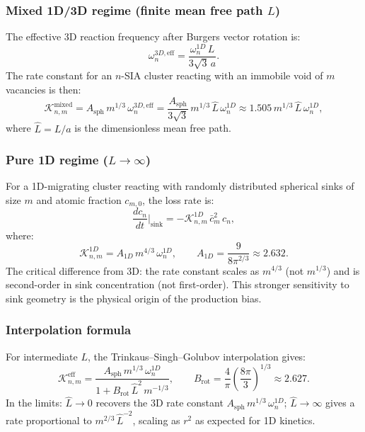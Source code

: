 \subsubsection{Mixed 1D/3D regime (finite mean free path $L$)}

The effective 3D reaction frequency after Burgers vector rotation is:
\begin{equation}\label{eq:omega_3D_eff}
    \omega_n^{3D,\mathrm{eff}}
    = \frac{\omega_n^{1D}\,L}{3\sqrt{3}\,a}.
\end{equation}
The rate constant for an $n$-SIA cluster reacting with an immobile void of $m$
vacancies is then:
\begin{equation}\label{eq:K_mixed}
    \mathcal{K}_{n,m}^{\mathrm{mixed}}
    = A_{\mathrm{sph}}\,m^{1/3}\,\omega_n^{3D,\mathrm{eff}}
    = \frac{A_{\mathrm{sph}}}{3\sqrt{3}}\,m^{1/3}\,\hat{L}\,\omega_n^{1D}
    \approx 1.505\,m^{1/3}\,\hat{L}\,\omega_n^{1D},
\end{equation}
where $\hat{L} = L/a$ is the dimensionless mean free path.

\subsubsection{Pure 1D regime ($L \to \infty$)}

For a 1D-migrating cluster reacting with randomly distributed spherical sinks
of size $m$ and atomic fraction $c_{m,0}$, the loss rate is:
\begin{equation}\label{eq:1D_loss}
    \frac{dc_n}{dt}\bigg|_{\text{sink}}
    = -\mathcal{K}_{n,m}^{1D}\,\bar{c}_m^2\,c_n,
\end{equation}
where:
\begin{equation}\label{eq:K1D}
    \mathcal{K}_{n,m}^{1D}
    = A_{1D}\,m^{4/3}\,\omega_n^{1D},
    \qquad A_{1D} = \frac{9}{8\pi^{2/3}} \approx 2.632.
\end{equation}
The critical difference from 3D: the rate constant scales as $m^{4/3}$ (not
$m^{1/3}$) and is second-order in sink concentration (not first-order). This
stronger sensitivity to sink geometry is the physical origin of the production
bias.

\subsubsection{Interpolation formula}

For intermediate $L$, the Trinkaus--Singh--Golubov interpolation gives:
\begin{equation}\label{eq:K_interp}
    \mathcal{K}_{n,m}^{\mathrm{eff}}
    = \frac{A_{\mathrm{sph}}\,m^{1/3}\,\omega_n^{1D}}
           {1 + B_{\mathrm{rot}}\,\hat{L}^2\,m^{-1/3}},
    \qquad B_{\mathrm{rot}}
    = \frac{4}{\pi}\left(\frac{8\pi}{3}\right)^{1/3}
    \approx 2.627.
\end{equation}
In the limits: $\hat{L} \to 0$ recovers the 3D rate constant
$A_{\mathrm{sph}}\,m^{1/3}\,\omega_n^{1D}$; $\hat{L} \to \infty$ gives a
rate proportional to $m^{2/3}\,\hat{L}^{-2}$, scaling as $r^2$ as expected
for 1D kinetics.

